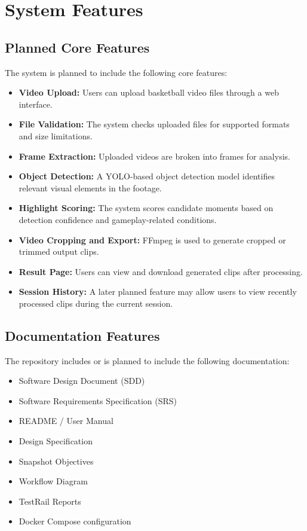 \documentclass[12pt]{article}
\begin{document}
\section{System Features}

\subsection{Planned Core Features}
The system is planned to include the following core features:

\begin{itemize}[noitemsep]
    \item \textbf{Video Upload:} Users can upload basketball video files through a web interface.
    \item \textbf{File Validation:} The system checks uploaded files for supported formats and size limitations.
    \item \textbf{Frame Extraction:} Uploaded videos are broken into frames for analysis.
    \item \textbf{Object Detection:} A YOLO-based object detection model identifies relevant visual elements in the footage.
    \item \textbf{Highlight Scoring:} The system scores candidate moments based on detection confidence and gameplay-related conditions.
    \item \textbf{Video Cropping and Export:} FFmpeg is used to generate cropped or trimmed output clips.
    \item \textbf{Result Page:} Users can view and download generated clips after processing.
    \item \textbf{Session History:} A later planned feature may allow users to view recently processed clips during the current session.
\end{itemize}

\subsection{Documentation Features}
The repository includes or is planned to include the following documentation:

\begin{itemize}[noitemsep]
    \item Software Design Document (SDD)
    \item Software Requirements Specification (SRS)
    \item README / User Manual
    \item Design Specification
    \item Snapshot Objectives
    \item Workflow Diagram
    \item TestRail Reports
    \item Docker Compose configuration
\end{itemize}
\end{document}
